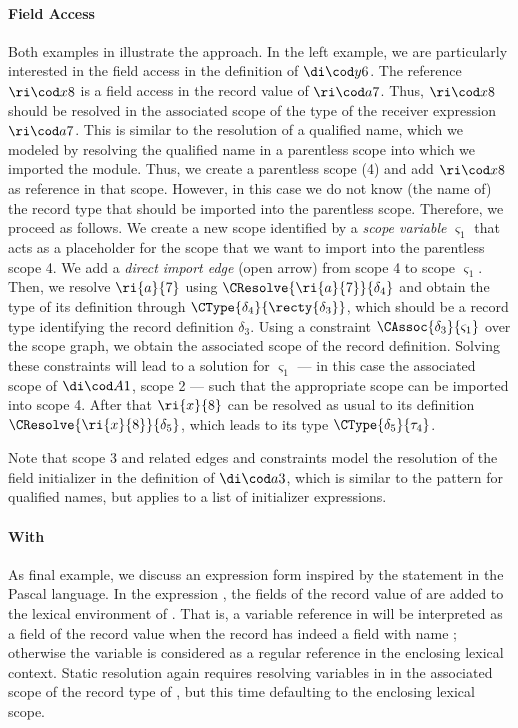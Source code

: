 \paragraph{Field Access}

Both examples in  illustrate the approach. In the left example, we
are particularly interested in the field access in the definition of $\dic{y}{6}$.
The reference $\ric{x}{8}$ is a field access in the record value of
$\ric{a}{7}$.
Thus, $\ric{x}{8}$ should be resolved in the associated scope of the type of the
receiver expression $\ric{a}{7}$.
This is similar to the resolution of a qualified name, which we modeled by
resolving the qualified name in a parentless scope into which we imported the
module.
Thus, we create a parentless scope (4) and add $\ric{x}{8}$ as reference in that
scope.
However, in this case we do not know (the name of) the record type that should
be imported into the parentless scope.
Therefore, we proceed as follows.
We create a new scope identified by a \emph{scope variable} $\varsigma_1$  that
acts as a placeholder for the scope that we want to import into the parentless
scope 4.
We add a \emph{direct import edge} (open arrow) from scope 4 to scope
$\varsigma_1$.
Then, we resolve $\ri{a}{7}$ using $\CResolve{\ri{a}{7}}{\delta_{4}}$ and obtain
the type of its definition through $\CType{\delta_{4}}{\recty{\delta_{3}}}$,
which should be a record type identifying the record definition $\delta_3$.
Using a constraint $\CAssoc{\delta_{3}}{\varsigma_{1}}$ over the scope graph, we
obtain the associated scope of the record definition.
Solving these constraints will lead to a solution for $\varsigma_{1}$ --- in
this case the associated scope of $\dic{A}{1}$, scope 2 --- such that the
appropriate scope can be imported into scope 4.
After that $\ri{x}{8}$ can be resolved as usual to its definition
$\CResolve{\ri{x}{8}}{\delta_{5}}$, which leads to its type
$\CType{\delta_{5}}{\tau_{4}}$.

Note that scope 3 and related edges and constraints model the resolution of the
field initializer in the definition of $\dic{a}{3}$, which is similar to the
pattern for qualified names, but applies to a list of initializer expressions.

\paragraph{With}

As final example, we discuss an expression form inspired by the  statement
in the Pascal language. In the expression , the fields of the record
value of  are added to the lexical environment of . That is, a
variable reference  in  will be interpreted as a field of the
record value when the record has indeed a field with name ; otherwise the
variable is considered as a regular reference in the enclosing lexical context.
Static resolution again requires resolving variables in  in the
associated scope of the record type of , but this time defaulting to the enclosing
lexical scope.

